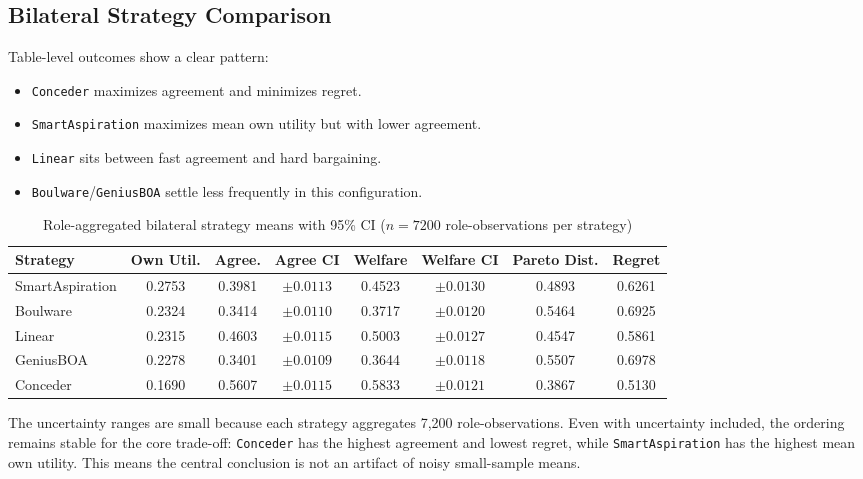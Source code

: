 \documentclass[11pt]{article}
\begin{document}
\subsection{Bilateral Strategy Comparison}
Table-level outcomes show a clear pattern:
\begin{itemize}[leftmargin=1.5em]
    \item \texttt{Conceder} maximizes agreement and minimizes regret.
    \item \texttt{SmartAspiration} maximizes mean own utility but with lower agreement.
    \item \texttt{Linear} sits between fast agreement and hard bargaining.
    \item \texttt{Boulware}/\texttt{GeniusBOA} settle less frequently in this configuration.
\end{itemize}

\begin{table}[H]
\centering
\caption{Role-aggregated bilateral strategy means with 95\% CI (\(n=7200\) role-observations per strategy)}
\small
\begin{tabular}{lccccccc}
\toprule
Strategy & Own Util. & Agree. & Agree CI & Welfare & Welfare CI & Pareto Dist. & Regret \\
\midrule
SmartAspiration & 0.2753 & 0.3981 & \(\pm 0.0113\) & 0.4523 & \(\pm 0.0130\) & 0.4893 & 0.6261 \\
Boulware & 0.2324 & 0.3414 & \(\pm 0.0110\) & 0.3717 & \(\pm 0.0120\) & 0.5464 & 0.6925 \\
Linear & 0.2315 & 0.4603 & \(\pm 0.0115\) & 0.5003 & \(\pm 0.0127\) & 0.4547 & 0.5861 \\
GeniusBOA & 0.2278 & 0.3401 & \(\pm 0.0109\) & 0.3644 & \(\pm 0.0118\) & 0.5507 & 0.6978 \\
Conceder & 0.1690 & 0.5607 & \(\pm 0.0115\) & 0.5833 & \(\pm 0.0121\) & 0.3867 & 0.5130 \\
\bottomrule
\end{tabular}
\end{table}

The uncertainty ranges are small because each strategy aggregates 7,200 role-observations. Even with uncertainty included, the ordering remains stable for the core trade-off: \texttt{Conceder} has the highest agreement and lowest regret, while \texttt{SmartAspiration} has the highest mean own utility. This means the central conclusion is not an artifact of noisy small-sample means.
\end{document}
